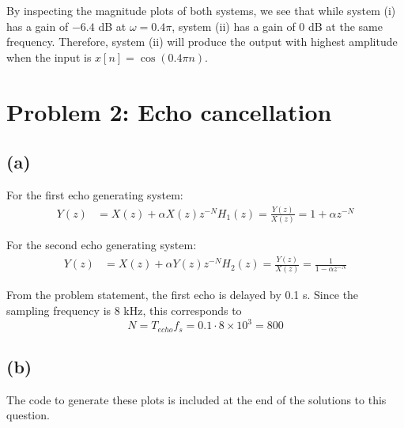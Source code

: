 \documentclass{article}
\begin{document}
By inspecting the magnitude plots of both systems, we see that while system (i) has a gain of $-6.4$ dB at $\omega =0.4\pi$, system (ii) has a gain of 0 dB at the same frequency. Therefore, system (ii) will produce the output with highest amplitude when the input is $x[n] = \cos(0.4\pi n)$.
	
\section{Problem 2: Echo cancellation}
\subsection{(a)}
For the first echo generating system:
\begin{align} \nonumber
Y(z) &= X(z) + \alpha X(z)z^{-N}
H_1(z) = \frac{Y(z)}{X(z)} = 1 + \alpha z^{-N}
\end{align}

For the second echo generating system:
\begin{align} \nonumber
Y(z) &= X(z) + \alpha Y(z)z^{-N}
H_2(z) = \frac{Y(z)}{X(z)} = \frac{1}{1 - \alpha z^{-N}}
\end{align}

From the problem statement, the first echo is delayed by 0.1 s. Since the sampling frequency is 8 kHz, this corresponds to 
\begin{equation}
N = T_{echo}f_s = 0.1\cdot 8\times 10^3 = 800
\end{equation}

\subsection{(b)}
The code to generate these plots is included at the end of the solutions to this question.
\end{document}
